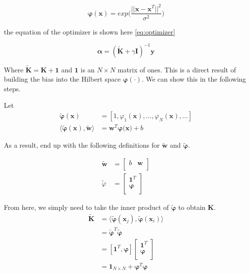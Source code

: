 \documentclass[conference]{IEEEtran}
\begin{document}
\begin{equation}
\mathbf{\varphi(x)} = exp\bigg(\frac{||\mathbf{x} - \mathbf{x}^T||^2}{\sigma^2}\bigg)
\label{eq:gaus_basis}
\end{equation}

the equation of the optimizer is shown here \ref{eq:optimizer} 

\begin{equation}
\mathbf{\alpha} = (\mathbf{\widetilde{K}} + \gamma \mathbf{I})^{-1}\mathbf{y}
\label{eq:optimizer}
\end{equation}

Where $\mathbf{\widetilde{K}} = \mathbf{K} + \mathbf{1}$ and $\mathbf{1}$ is an $N \times N$ matrix of ones. This is a direct result
of building the bias into the Hilbert space $\mathbf{\varphi(\cdot)}$. We can show this in the following steps. 

Let 
\begin{align*}
\mathbf{\widetilde{\varphi}(x)} &= [1, \varphi_1(\mathbf{x}),  \ldots, \varphi_N(\mathbf{x}), \ldots ] \\
\langle\mathbf{\widetilde{\varphi}(x)}, \mathbf{\widetilde{w}} \rangle &= \mathbf{w}^T\mathbf{\varphi(\mathbf{x}}) + b 
\end{align*}

As a result, end up with the following definitions for $\mathbf{\widetilde{w}}$ and $\mathbf{\widetilde{\varphi}}$.
\newcommand{\newPhi}{\mathbf{\widetilde{\varphi}}}

\begin{align*}
 \mathbf{\widetilde{w}} &= 
\begin{bmatrix}
b & \mathbf{w}  \\
\end{bmatrix} \\
\widetilde{\varphi} &= 
\begin{bmatrix} 
\mathbf{1}^T \\
\mathbf{\varphi} \\
\end{bmatrix}
\end{align*}

From here, we simply need to take the inner product of $\mathbf{\widetilde{\varphi}}$ to obtain $\mathbf{K}$. 
\begin{align*}
 \widetilde{\mathbf{K} }&= \langle \newPhi(\mathbf{x}_j), \newPhi(\mathbf{x}_i) \rangle \\
 & = \newPhi^T\newPhi \\
 &= [\mathbf{1}^T, \mathbf{\varphi}] 
 \begin{bmatrix}
 \mathbf{1}^T \\
\mathbf{\varphi} \\
 \end{bmatrix} \\
 &= \mathbf{1}_{N \times N} + \mathbf{\varphi}^T\mathbf{\varphi}
\end{align*}
\end{document}

